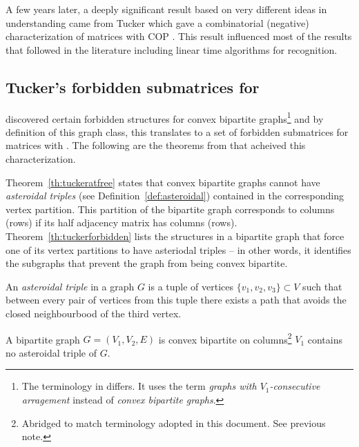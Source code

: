 A few years later, a deeply significant result based on very different
ideas in understanding \COP came from Tucker which gave a
combinatorial (negative) characterization of matrices with COP
\cite{at72}. This result influenced most of the \COP results that
followed in the literature including linear time
algorithms for \COP
recognition.


\subsection{Tucker's forbidden submatrices for \COP}
\label{sec:tucker}

\cite{at72} discovered certain forbidden structures for convex
bipartite graphs\footnote{The terminology in \cite{at72} differs. It
  uses the term {\em graphs with $V_1$-consecutive arragement} instead
  of {\em convex bipartite graphs}.} and by definition of this graph
class, this translates to a set of forbidden submatrices for matrices
with \cop.  The following are the theorems from \cite{at72} that
acheived this characterization.


Theorem~\ref{th:tuckeratfree} states that convex bipartite graphs
cannot have {\em asteroidal triples} (see
Definition~\ref{def:asteroidal}) contained in the corresponding vertex
partition. This partition of the bipartite graph corresponds to
columns (rows) if its half adjacency matrix has \COP columns (rows).
Theorem~\ref{th:tuckerforbidden} lists the structures in a bipartite
graph that force one of its vertex partitions to have asteriodal
triples -- in other words, it identifies the subgraphs that prevent
the graph from being convex bipartite.

\begin{definition}
  \label{def:asteroidal}
  An {\em asteroidal triple} in a graph $G$ is a tuple of vertices
  $\{v_1,v_2,v_3\} \subset V$ such that between every pair of vertices
  from this tuple there exists a path that avoids the closed
  neighbourbood of the third vertex.
\end{definition}

\begin{theoremsansproof}
  A bipartite graph $G = (V_1, V_2, E)$ is convex bipartite on
  columns\footnote{Abridged to match terminology adopted in this
    document. See previous note.} \iff $V_1$ contains no asteroidal
  triple of $G$.
  \label{th:tuckeratfree}
\end{theoremsansproof}

